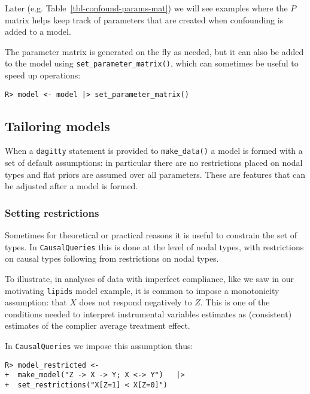 \documentclass[
  11pt,
  article]{jss}
\begin{document}
Later (e.g. Table~\ref{tbl-confound-params-mat}) we will see examples
where the \(P\) matrix helps keep track of parameters that are created
when confounding is added to a model.

The parameter matrix is generated on the fly as needed, but it can also
be added to the model using \texttt{set\_parameter\_matrix()}, which can
sometimes be useful to speed up operations:

\begin{verbatim}
R> model <- model |> set_parameter_matrix()
\end{verbatim}

\hypertarget{tailoring-models}{%
\subsection{Tailoring models}\label{tailoring-models}}

When a \texttt{dagitty} statement is provided to \texttt{make\_data()} a
model is formed with a set of default assumptions: in particular there
are no restrictions placed on nodal types and flat priors are assumed
over all parameters. These are features that can be adjusted after a
model is formed.

\hypertarget{restrictions}{%
\subsubsection{Setting restrictions}\label{restrictions}}

Sometimes for theoretical or practical reasons it is useful to constrain
the set of types. In \texttt{CausalQueries} this is done at the level of
nodal types, with restrictions on causal types following from
restrictions on nodal types.

To illustrate, in analyses of data with imperfect compliance, like we
saw in our motivating \texttt{lipids} model example, it is common to
impose a monotonicity assumption: that \(X\) does not respond negatively
to \(Z\). This is one of the conditions needed to interpret instrumental
variables estimates as (consistent) estimates of the complier average
treatment effect.

In \texttt{CausalQueries} we impose this assumption thus:

\begin{verbatim}
R> model_restricted <- 
+  make_model("Z -> X -> Y; X <-> Y")   |> 
+  set_restrictions("X[Z=1] < X[Z=0]")
\end{verbatim}
\end{document}
